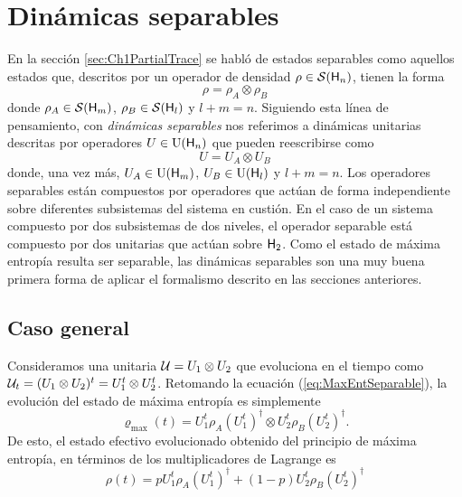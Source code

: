 \section{Dinámicas separables}

En la sección \ref{sec:Ch1PartialTrace} se habló de estados separables como aquellos estados que, descritos por un operador de densidad $\rho\in\mathcal{S}({\sf H}_{n})$, tienen la forma
\begin{equation*}
    \rho=\rho_{A}\otimes\rho_{B}
\end{equation*}
donde $\rho_{A}\in\mathcal{S}({\sf H}_{m})$, $\rho_{B}\in\mathcal{S}({\sf H}_{l})$ y $l+m=n$. Siguiendo esta línea de pensamiento, con \textit{dinámicas separables} nos referimos a dinámicas unitarias descritas por operadores $U\in\text{U}({\sf H}_{n})$ que pueden reescribirse como
\begin{equation*}
    U=U_{A}\otimes U_{B}
\end{equation*}
donde, una vez más, $U_{A}\in\text{U}({\sf H}_{m})$, $U_{B}\in\text{U}({\sf H}_{l})$ y $l+m=n$. Los operadores separables están compuestos por operadores que actúan de forma independiente sobre diferentes subsistemas del sistema en custión. En el caso de un sistema compuesto por dos subsistemas de dos niveles, el operador separable está compuesto por dos unitarias que actúan sobre ${\sf H}_{2}$. Como el estado de máxima entropía resulta ser separable, las dinámicas separables son una muy buena primera forma de aplicar el formalismo descrito en las secciones anteriores.

\subsection{Caso general}

Consideramos una unitaria $\mathcal{U}=U_{1}\otimes U_{2}$ que evoluciona en el tiempo como $\mathcal{U}_{t}=(U_{1}\otimes U_{2})^{t}=U_{1}^{t}\otimes U_{2}^{t}$. Retomando la ecuación (\ref{eq:MaxEntSeparable}), la evolución del estado de máxima entropía es simplemente
\begin{equation*}
    \varrho_{\max}(t)=U_{1}^{t}\rho_{A}(U_{1}^{t})^{\dag}\otimes U_{2}^{t}\rho_{B} (U_{2}^{t})^{\dag}.
\end{equation*}
De esto, el estado efectivo evolucionado obtenido del principio de máxima entropía, en términos de los multiplicadores de Lagrange es
\begin{equation*}
    \rho(t)=pU_{1}^{t}\rho_{A}(U_{1}^{t})^{\dag}+(1-p)U_{2}^{t}\rho_{B} (U_{2}^{t})^{\dag}
\end{equation*}

